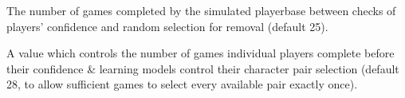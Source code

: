 \begin{description}[style=multiline,leftmargin=3cm]
  \item[boredom\\period] The number of games completed by the simulated
  playerbase between checks of players' confidence and random selection for
  removal (default 25).
  \item[initial\\exploration] A value which controls the number of
  games individual players complete before their confidence \& learning models control
  their character pair selection (default 28, to allow sufficient games to
  select every available pair exactly once).
\end{description}
  
